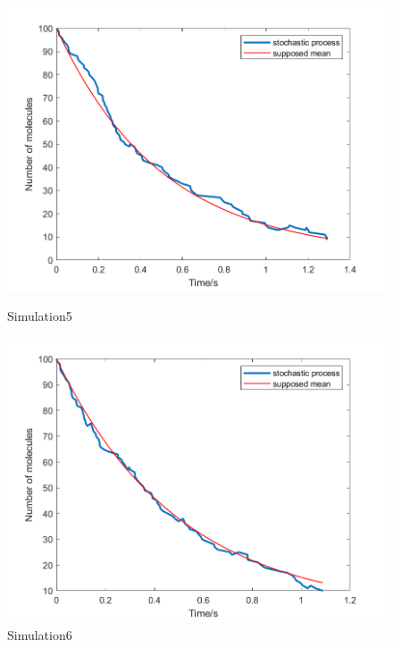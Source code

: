 \documentclass{article}
\begin{document}
\begin{figure}[htbp]
    \centering
    \begin{minipage}{0.45\linewidth}
        \centering
        \includegraphics[width=\linewidth]{graph/c5.png}
        \caption{Simulation5}
        \label{c5}
    \end{minipage}
    \hfill
    \begin{minipage}{0.45\linewidth}
        \centering
        \includegraphics[width=\linewidth]{graph/c6.png}
        \caption{Simulation6}
        \label{c6}
    \end{minipage}
\end{figure}
\end{document}
